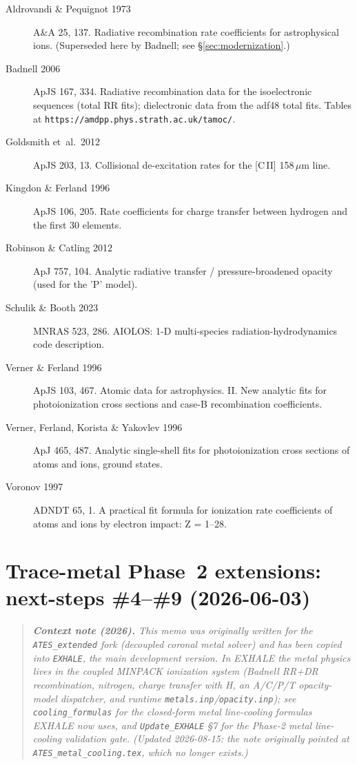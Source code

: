 \documentclass[english,a4paper]{my_memo}
\begin{document}
\begin{description}
  \item[Aldrovandi \& Pequignot 1973] A\&A 25, 137.  Radiative
    recombination rate coefficients for astrophysical ions.
    (Superseded here by Badnell; see \S\ref{sec:modernization}.)
  \item[Badnell 2006] ApJS 167, 334.  Radiative recombination data
    for the isoelectronic sequences (total RR fits); dielectronic data
    from the adf48 total fits.  Tables at
    \texttt{https://amdpp.phys.strath.ac.uk/tamoc/}.
  \item[Goldsmith et~al.~2012] ApJS 203, 13.  Collisional
    de-excitation rates for the [C\,II] 158\,$\mu$m line.
  \item[Kingdon \& Ferland 1996] ApJS 106, 205.  Rate coefficients for
    charge transfer between hydrogen and the first 30 elements.
  \item[Robinson \& Catling 2012] ApJ 757, 104.  Analytic radiative
    transfer / pressure-broadened opacity (used for the 'P' model).
  \item[Schulik \& Booth 2023] MNRAS 523, 286.  AIOLOS:
    1-D multi-species radiation-hydrodynamics code description.
  \item[Verner \& Ferland 1996] ApJS 103, 467.  Atomic data for
    astrophysics. II. New analytic fits for photoionization cross
    sections and case-B recombination coefficients.
  \item[Verner, Ferland, Korista \& Yakovlev 1996] ApJ 465, 487.
    Analytic single-shell fits for photoionization cross sections of
    atoms and ions, ground states.
  \item[Voronov 1997] ADNDT 65, 1.  A practical fit formula for
    ionization rate coefficients of atoms and ions by electron
    impact: Z = 1--28.
\end{description}


\part{Trace-metal Phase~2 extensions: next-steps \#4--\#9 (2026-06-03)}

\begin{quote}\small\itshape
\textbf{Context note (2026).} This memo was originally written for the
\texttt{ATES\_extended} fork (decoupled coronal metal solver) and has
been copied into \texttt{EXHALE}, the main development version. In
EXHALE the metal physics lives in the coupled MINPACK ionization
system (Badnell RR+DR recombination, nitrogen, charge transfer with H,
an A/C/P/T opacity-model dispatcher, and runtime
\texttt{metals.inp}/\texttt{opacity.inp}); see
\texttt{cooling\_formulas} for the closed-form metal line-cooling formulas
EXHALE now uses, and \texttt{Update\_EXHALE} \S7 for the Phase-2 metal
line-cooling validation gate. (Updated 2026-08-15: the note originally
pointed at \texttt{ATES\_metal\_cooling.tex}, which no longer exists.)
\end{quote}
\end{document}
